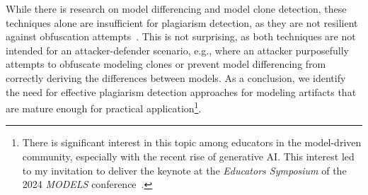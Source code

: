 While there is research on model differencing and model clone detection, these techniques alone are insufficient for plagiarism detection, as they are not resilient against obfuscation attempts~\cite{Wittler2023, Saglam2022, Martinez2020}.
This is not surprising, as both techniques are not intended for an attacker-defender scenario, e.g., where an attacker purposefully attempts to obfuscate modeling clones or prevent model differencing from correctly deriving the differences between models.
%
As a conclusion, we identify the need for effective plagiarism detection approaches for modeling artifacts that are mature enough for practical application\footnote{There is significant interest in this topic among educators in the model-driven community, especially with the recent rise of generative AI. This interest led to my invitation to deliver the keynote at the \textit{Educators Symposium} of the 2024 \textit{MODELS} conference~\cite{models2024_preface}.}.

